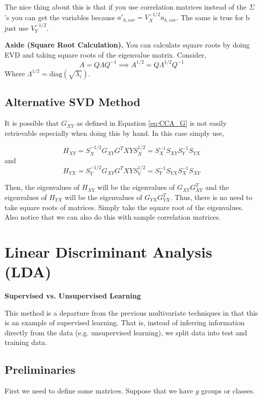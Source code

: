 \documentclass[twoside]{article}
\newcommand\diag[1]{\text{diag}(#1)}
\begin{document}
The nice thing about this is that if you use correlation matrices instead of the $\Sigma$'s you can get the variables because $a'_{k, cor} = V^{-1/2}_Xa_{k, cov}$. The same is true for b just use $V_Y^{-1/2}$.

\begin{mdframed}
\textbf{Aside (Square Root Calculation).} You can calculate square roots by doing EVD and taking square roots of the eigenvalue matrix. Consider,
$$A = Q\Lambda Q^{-1} \implies A^{1/2} = Q\Lambda^{1/2}Q^{-1}$$
Where $\Lambda^{1/2} = \diag{\sqrt{\lambda_i}}$.
\end{mdframed}

\subsection{Alternative SVD Method}

It is possible that $G_{XY}$ as defined in Equation \ref{eq:CCA_G} is not easily retrievable especially when doing this by hand. In this case simply use,


$$H_{XY} = S_X^{-1/2}G_{XY}G^T{XY}S_{X}^{1/2} = S_X^{-1}S_{XY}S_{Y}^{-1}S_{YX}$$
and 
$$H_{YX} = S_Y^{-1/2}G_{XY}G^T{XY}S_{Y}^{1/2} = S_Y^{-1}S_{YX}S_{X}^{-1}S_{XY}$$


Then, the eigenvalues of $H_{XY}$ will be the eigenvalues of $G_{XY}G_{XY}^T$ and the eigenvalues of $H_{YX}$ will be the eigenvalues of $G_{YX}G_{YX}^T$. Thus, there is no need to take square roots of matrices. Simply take the square root of the eigenvalues. Also notice that we can also do this with sample correlation matrices.

\section{Linear Discriminant Analysis (LDA)}

\textbf{Supervised vs. Unsupervised Learning}

This method is a departure from the previous multivariate techniques in that this is an example of supervised learning. That is, instead of inferring information directly from the data (e.g. unsupervised learning), we split data into test and training data.

\subsection{Preliminaries}

First we need to define some matrices. Suppose that we have $g$ groups or classes.
\end{document}
